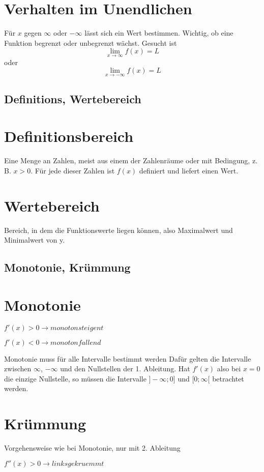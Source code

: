 \section*{Verhalten im Unendlichen}
Für $x$ gegen $\infty$ oder $-\infty$ lässt sich ein Wert bestimmen.
Wichtig, ob eine Funktion begrenzt oder unbegrenzt wächst.
Gesucht ist \[\lim _{x \to \infty} f(x) = L\] oder \[\lim _{x \to -\infty} f(x) = L\]

\subsection{Definitions, Wertebereich}

\section*{Definitionsbereich}
Eine Menge an Zahlen, meist aus einem der Zahlenräume oder mit Bedingung, z. B. $x > 0$. Für jede dieser Zahlen
ist $f(x)$ definiert und liefert einen Wert.

\section*{Wertebereich}
Bereich, in dem die Funktionswerte liegen können, also Maximalwert und Minimalwert von y.

\subsection{Monotonie, Krümmung}

\section*{Monotonie}
$f'(x) > 0 \rightarrow monoton steigent$

$f'(x) < 0 \rightarrow monoton fallend$

Monotonie muss für alle Intervalle bestimmt werden
Dafür gelten die Intervalle zwischen $\infty$, $-\infty$ und den Nullstellen der 1. Ableitung.
Hat $f'(x)$ also bei $x = 0$ die einzige Nullstelle, so müssen die Intervalle $]-\infty;0]$ und $[0;\infty[$
betrachtet werden.

\section*{Krümmung}
Vorgehensweise wie bei Monotonie, nur mit 2. Ableitung

$f''(x) > 0 \rightarrow links gekruemmt$

